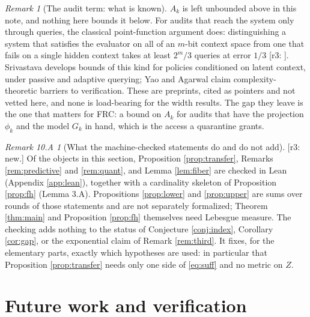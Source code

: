 \documentclass[11pt]{article}
\theoremstyle{definition}
\theoremstyle{remark}
\newtheorem{remark}{Remark}[section]
\newtheorem*{remtenA}{Remark 10.A}
\newcommand{\revnote}[1]{\textcolor{red!60!black}{[r3: #1]}}
\begin{document}
\begin{remark}[The audit term: what is known]\label{rem:audit}
$A_k$ is left unbounded above in this note, and nothing here bounds it below. For audits that reach the system only through queries, the classical point-function argument does: distinguishing a system that satisfies the evaluator on all of an $m$-bit context space from one that fails on a single hidden context takes at least $2^m/3$ queries at error $1/3$ \revnote{\cite{yao1977,goldreich1998}}. Srivastava \cite{srivastava2026} develops bounds of this kind for policies conditioned on latent context, under passive and adaptive querying; Yao \cite{yao2025trap} and Agarwal \cite{agarwal2026} claim complexity-theoretic barriers to verification. These are preprints, cited as pointers and not vetted here, and none is load-bearing for the width results. The gap they leave is the one that matters for FRC: a bound on $A_k$ for audits that have the projection $\phi_k$ and the model $G_k$ in hand, which is the access a quarantine grants.
\end{remark}

\begin{remtenA}[What the machine-checked statements do and do not add]
\revnote{new.} Of the objects in this section, Proposition \ref{prop:transfer}, Remarks \ref{rem:predictive} and \ref{rem:quant}, and Lemma \ref{lem:fiber} are checked in Lean (Appendix \ref{app:lean}), together with a cardinality skeleton of Proposition \ref{prop:fh} (Lemma 3.A). Propositions \ref{prop:lower} and \ref{prop:upper} are sums over rounds of those statements and are not separately formalized; Theorem \ref{thm:main} and Proposition \ref{prop:fh} themselves need Lebesgue measure. The checking adds nothing to the status of Conjecture \ref{conj:index}, Corollary \ref{cor:gap}, or the exponential claim of Remark \ref{rem:third}. It fixes, for the elementary parts, exactly which hypotheses are used: in particular that Proposition \ref{prop:transfer} needs only one side of \eqref{eq:suff} and no metric on $Z$.
\end{remtenA}

\section{Future work and verification}\label{sec:future}
\end{document}
